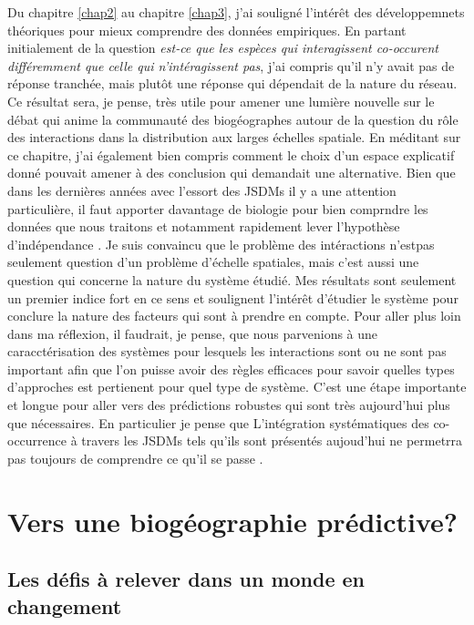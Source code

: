 Du chapitre \ref{chap2} au chapitre \ref{chap3}, j'ai souligné l'intérêt
des développemnets théoriques pour mieux comprendre des données
empiriques. En partant initialement de la question \emph{est-ce que les
espèces qui interagissent co-occurent différemment que celle qui
n'intéragissent pas}, j'ai compris qu'il n'y avait pas de réponse
tranchée, mais plutôt une réponse qui dépendait de la nature du réseau.
Ce résultat sera, je pense, très utile pour amener une lumière nouvelle
sur le débat qui anime la communauté des biogéographes autour de la
question du rôle des interactions dans la distribution aux larges
échelles spatiale. En méditant sur ce chapitre, j'ai également bien
compris comment le choix d'un espace explicatif donné pouvait amener à
des conclusion qui demandait une alternative. Bien que dans les
dernières années avec l'essort des JSDMs il y a une attention
particulière, il faut apporter davantage de biologie pour bien comprndre
les données que nous traitons et notamment rapidement lever l'hypothèse
d'indépendance \citep{Elith2006}. Je suis convaincu que le problème des
intéractions n'estpas seulement question d'un problème d'échelle
spatiales\citep{Araujo2014, Belmaker2015}, mais c'est aussi une question
qui concerne la nature du système étudié. Mes résultats sont seulement
un premier indice fort en ce sens et soulignent l'intérêt d'étudier le
système pour conclure la nature des facteurs qui sont à prendre en
compte. Pour aller plus loin dans ma réflexion, il faudrait, je pense,
que nous parvenions à une caracctérisation des systèmes pour lesquels
les interactions sont ou ne sont pas important afin que l'on puisse
avoir des règles efficaces pour savoir quelles types d'approches est
pertienent pour quel type de système. C'est une étape importante et
longue pour aller vers des prédictions robustes qui sont très
aujourd'hui plus que nécessaires. En particulier je pense que
L'intégration systématiques des co-occurrence à travers les JSDMs tels
qu'ils sont présentés aujoud'hui ne permetrra pas toujours de comprendre
ce qu'il se passe \citep{Ovaskainen2010, Pollock2014, Warton2015b}.

\section*{Vers une biogéographie
prédictive?}\label{vers-une-bioguxe9ographie-pruxe9dictive}

\subsection*{Les défis à relever dans un monde en
changement}\label{les-duxe9fis-uxe0-relever-dans-un-monde-en-changement}

